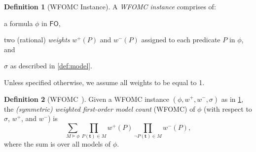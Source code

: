 \documentclass[letterpaper]{article} %
\theoremstyle{remark}
\theoremstyle{definition}
\newtheorem{definition}{Definition}
\newcommand{\FO}{$\mathsf{FO}$}
\begin{document}
\begin{definition}[WFOMC Instance]\label{def:instance}
  A \emph{WFOMC instance} comprises of:
  \begin{enumerate*}[label=(\roman*)]
    \item a formula $\phi$ in \FO{},
    \item two (rational) \emph{weights} $w^{+}(P)$ and $w^{-}(P)$ assigned to
    each predicate $P$ in $\phi$, and
    \item $\sigma$ as described in \cref{def:model}.
  \end{enumerate*}
  Unless specified otherwise, we assume all weights to be equal to 1.
\end{definition}

\begin{definition}[WFOMC~\cite{DBLP:conf/ijcai/BroeckTMDR11}]
  Given a WFOMC instance $(\phi, w^{+}, w^{-}, \sigma)$ as in
  \cref{def:instance}, the \emph{(symmetric) weighted first-order model count}
  (WFOMC) of $\phi$ (with respect to $\sigma$, $w^{+}$, and $w^{-}$) is
  \begin{equation}\label{eq:wfomc}
    \sum_{M \models \phi} \prod_{P(\mathbf{t}) \in M} w^{+}(P) \prod_{\neg P(\mathbf{t}) \in M} w^{-}(P),
  \end{equation}
  where the sum is over all models of $\phi$.
\end{definition}
\end{document}

